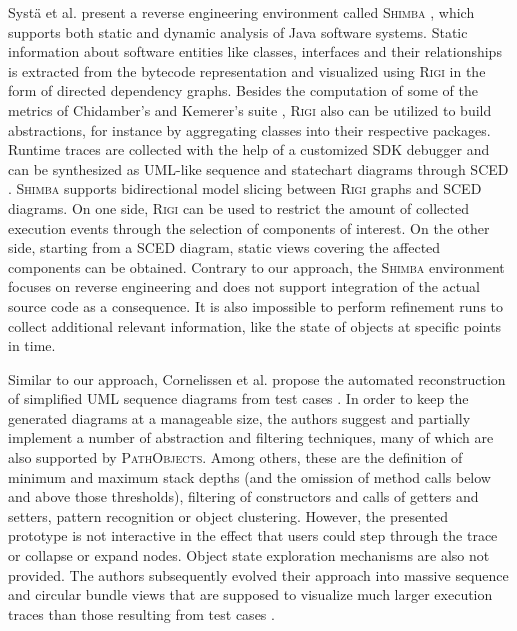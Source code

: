 Systä et al. present a reverse engineering environment called \textsc{Shimba} \cite{systa_shimba_2001}, which supports both static and dynamic analysis of Java software systems.
Static information about software entities like classes, interfaces and their relationships is extracted from the bytecode representation and visualized using \textsc{Rigi} \cite{muller_understanding_1993} in the form of directed dependency graphs.
Besides the computation of some of the metrics of Chidamber's and Kemerer's suite \cite{chidamber_metrics_1994}, \textsc{Rigi} also can be utilized to build abstractions, for instance by aggregating classes into their respective packages.
Runtime traces are collected with the help of a customized SDK debugger and can be synthesized as UML-like sequence and statechart diagrams through \textsc{SCED} \cite{koskimies_automated_1998,systa_understanding_2000}.
\textsc{Shimba} supports bidirectional model slicing between \textsc{Rigi} graphs and \textsc{SCED} diagrams.
On one side, \textsc{Rigi} can be used to restrict the amount of collected execution events through the selection of components of interest.
On the other side, starting from a \textsc{SCED} diagram, static views covering the affected components can be obtained.
Contrary to our approach, the \textsc{Shimba} environment focuses on reverse engineering and does not support integration of the actual source code as a consequence.
It is also impossible to perform refinement runs to collect additional relevant information, like the state of objects at specific points in time.

Similar to our approach, Cornelissen et al. propose the automated reconstruction of simplified UML sequence diagrams from test cases \cite{cornelissen_visualizing_2007}.
In order to keep the generated diagrams at a manageable size, the authors suggest and partially implement a number of abstraction and filtering techniques, many of which are also supported by \textsc{PathObjects}.
Among others, these are the definition of minimum and maximum stack depths (and the omission of method calls below and above those thresholds), filtering of constructors and calls of getters and setters, pattern recognition or object clustering.
However, the presented prototype is not interactive in the effect that users could step through the trace or collapse or expand nodes.
Object state exploration mechanisms are also not provided.
The authors subsequently evolved their approach into massive sequence and circular bundle views that are supposed to visualize much larger execution traces than those resulting from test cases \cite{cornelissen_understanding_2007, cornelissen_execution_2008}.

